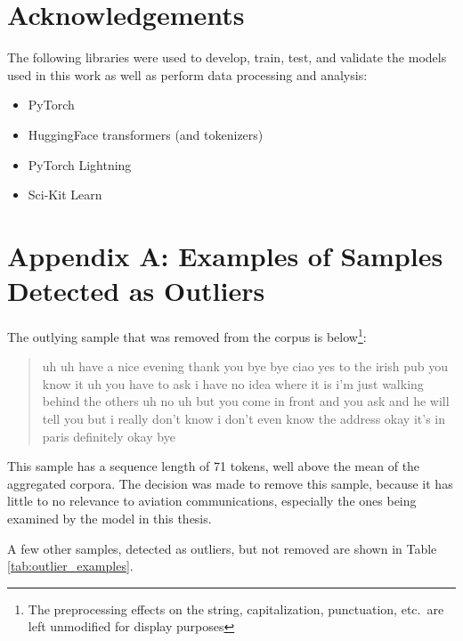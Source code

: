 \documentclass[12pt]{article}
\begin{document}
\newpage
\section{Acknowledgements}
The following libraries were used to develop, train, test, and validate the models used in this work as well as perform data processing and analysis:
\begin{itemize}
    \item PyTorch \cite{paszke_pytorch_2019}
    \item HuggingFace transformers (and tokenizers) \cite{wolf_transformers_2020}
    \item PyTorch Lightning \cite{falcon_pytorchlightning_2019}
    \item Sci-Kit Learn \cite{pedregosa_scikit-learn_2011}
\end{itemize}

\newpage
\section{Appendix A: Examples of Samples Detected as Outliers}\label{sec:appendix_a}
The outlying sample that was removed from the corpus is below\footnote{The preprocessing effects on the string, capitalization, punctuation, etc.~are
    left unmodified for display purposes}:

\begin{quote}
    uh uh have a nice evening thank you bye bye ciao yes to the irish pub you know it uh you have to ask i have no idea where it is i'm just walking
    behind the others uh no uh but you come in front and you ask and he will tell you but i really don't know i don't even know the address okay it's
    in paris definitely okay bye
\end{quote}

This sample has a sequence length of 71 tokens, well above the mean of the aggregated corpora. The decision was made to remove this sample, because
it has little to no relevance to aviation communications, especially the ones being examined by the model in this thesis.

A few other samples, detected as outliers, but not removed are shown in Table \ref{tab:outlier_examples}.
\end{document}
